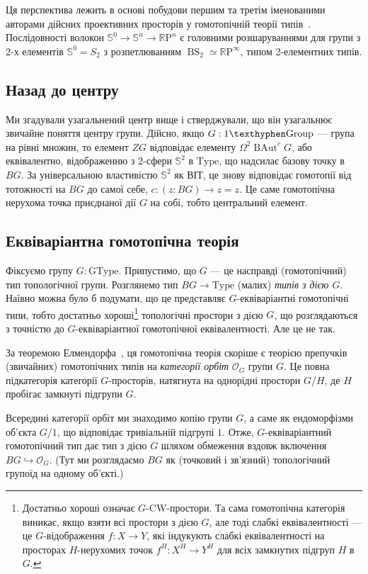 \documentclass[12pt]{article}
\newcommand*{\Loop}{\Omega}
\newcommand*{\bS}{{\mathbb{S}}}
\newcommand*{\RP}{{\mathbb{R}\mathrm{P}}}
\renewcommand*{\equiv}{\mathrel{\simeq}}
\DeclareMathOperator\BAut{BAut}
\newcommand*\BS{\mathop{BS}}
\newcommand*\Sym{S}
\newcommand*{\Type}{\mathrm{Type}}
\newcommand*{\GType}{\mathrm{GType}}
\newcommand*{\Grp}{\mathrm{\texthyphen Group}}
\begin{document}
Ця перспектива лежить в основі побудови першим та третім іменованими авторами дійсних проективних просторів у гомотопічній теорії типів~\cite{realprojective}. Послідовності волокон $\bS^0 \to \bS^n \to \RP^n$ є головними розшаруваннями для групи з 2-х елементів $\bS^0 = \Sym_2$ з розпетлюванням $\BS_2 \equiv \RP^\infty$, типом 2-елементних типів.

\subsection{Назад до центру}
\label{sec:center}

Ми згадували узагальнений центр вище і стверджували, що він узагальнює звичайне поняття центру групи. Дійсно, якщо $G : 1\Grp$ — група на рівні множин, то елемент $ZG$ відповідає елементу $\Loop^2 \BAut^c G$, або еквівалентно, відображенню з 2-сфери $\bS^2$ в $\Type$, що надсилає базову точку в $BG$. За універсальною властивістю $\bS^2$ як ВІТ, це знову відповідає гомотопії від тотожності на $BG$ до самої себе, $c : (z : BG) \to z = z$. Це саме гомотопічна нерухома точка приєднаної дії $G$ на собі, тобто центральний елемент.

\subsection{Еквіваріантна гомотопічна теорія}
\label{sec:equivariant}

Фіксуємо групу $G : \GType$. Припустимо, що $G$ — це насправді (гомотопічний) тип топологічної групи. Розглянемо тип $BG \to \Type$ (малих) \emph{типів з дією $G$}. Наївно можна було б подумати, що це представляє $G$-еквіваріантні гомотопічні типи, тобто достатньо хороші\footnote{Достатньо хороші означає $G$-CW-простори. Та сама гомотопічна категорія виникає, якщо взяти всі простори з дією $G$, але тоді слабкі еквівалентності — це $G$-відображення $f : X \to Y$, які індукують слабкі еквівалентності на просторах $H$-нерухомих точок $f^H : X^H \to Y^H$ для всіх замкнутих підгруп $H$ в $G$.} топологічні простори з дією $G$, що розглядаються з точністю до $G$-еквіваріантної гомотопічної еквівалентності. Але це не так.

За теоремою Елмендорфа~\cite{Elmendorf1983}, ця гомотопічна теорія скоріше є теорією препучків (звичайних) гомотопічних типів на \emph{категорії орбіт} $\mathcal{O}_G$ групи $G$. Це повна підкатегорія категорії $G$-просторів, натягнута на однорідні простори $G/H$, де $H$ пробігає замкнуті підгрупи $G$.

Всередині категорії орбіт ми знаходимо копію групи $G$, а саме як ендоморфізми об'єкта $G/1$, що відповідає тривіальній підгрупі $1$. Отже, $G$-еквіваріантний гомотопічний тип дає тип з дією $G$ шляхом обмеження вздовж включення $BG \hookrightarrow \mathcal{O}_G$. (Тут ми розглядаємо $BG$ як (точковий і зв'язний) топологічний групоїд на одному об'єкті.)
\end{document}
